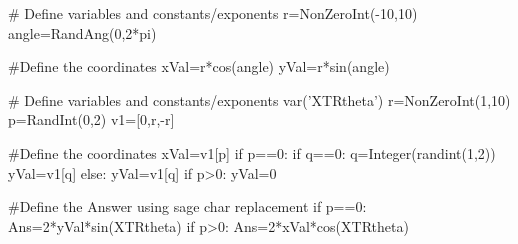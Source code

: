 
\begin{sagesilent}
# Define variables and constants/exponents
r=NonZeroInt(-10,10)
angle=RandAng(0,2*pi)

#Define the coordinates
xVal=r*cos(angle)
yVal=r*sin(angle)
\end{sagesilent}


\begin{sagesilent}
# Define variables and constants/exponents
var('XTRtheta')
r=NonZeroInt(1,10)
p=RandInt(0,2)
v1=[0,r,-r]

#Define the coordinates
xVal=v1[p]
if p==0:
   if q==0:
      q=Integer(randint(1,2))
      yVal=v1[q]
   else:
      yVal=v1[q]
if p>0:
   yVal=0

#Define the Answer using sage char replacement
if p==0:
   Ans=2*yVal*sin(XTRtheta)
if p>0:
   Ans=2*xVal*cos(XTRtheta)
\end{sagesilent}


